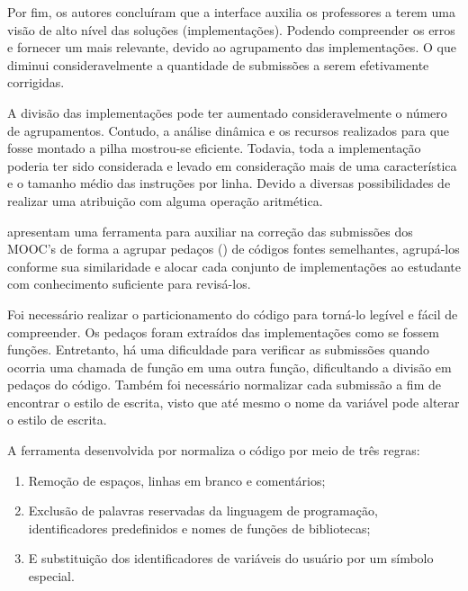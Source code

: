 	    Por fim, os autores concluíram que a interface auxilia os professores a terem
	    uma visão de alto nível das soluções (implementações). Podendo compreender os
	    erros e fornecer um  mais relevante, devido ao agrupamento
	    das implementações. O que diminui consideravelmente a quantidade de submissões
	    a serem efetivamente corrigidas.
	    
	    A divisão das implementações pode ter aumentado consideravelmente o número de
	    agrupamentos. Contudo, a análise dinâmica e os recursos realizados para que
	    fosse montado a pilha mostrou-se eficiente. Todavia, toda a implementação
	    poderia ter sido considerada e levado em consideração mais de uma característica
	    e o tamanho médio das instruções por linha. Devido a diversas possibilidades de
	    realizar uma atribuição com alguma operação aritmética.
	    
	     apresentam uma ferramenta para auxiliar na correção das
	    submissões dos MOOC's de forma a agrupar pedaços () de códigos
	    fontes semelhantes, agrupá-los conforme sua similaridade e alocar cada conjunto
	    de implementações ao estudante com conhecimento suficiente para revisá-los.
	    
	    Foi necessário realizar o particionamento do código para torná-lo legível
	    e fácil de compreender. Os pedaços foram extraídos das implementações como
	    se fossem funções. Entretanto, há uma dificuldade para verificar as submissões
	    quando ocorria uma chamada de função em uma outra função, dificultando a divisão
	    em pedaços do código. Também foi necessário normalizar cada submissão a fim de
	    encontrar o estilo de escrita, visto que até mesmo o nome da variável pode
	    alterar o estilo de escrita.
	    
	    A ferramenta desenvolvida por  normaliza o código por
	    meio de três regras:
	    
	    \begin{enumerate}
	    	\item Remoção de espaços, linhas em branco e comentários;
	    	\item Exclusão de palavras reservadas da linguagem de programação,
	    	identificadores predefinidos e nomes de funções de bibliotecas;
	    	\item E substituição dos identificadores de variáveis do usuário por um
	    	símbolo especial.
	    \end{enumerate}
	    

